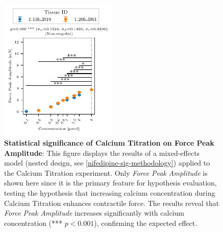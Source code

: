 \documentclass{report}
\begin{document}
    
            \begin{figure}[H]
                \centering
                \includegraphics[width=0.5\textwidth, keepaspectratio]{plots/chapter_5/ca_titration/significance_features_lmer_subset_1.pdf}
                    \caption[Statistical significance of Calcium Titration on Force Peak Amplitude]{\textbf{Statistical significance of Calcium Titration on Force Peak Amplitude}:  
                This figure displays the results of a mixed-effects model (nested design, see \ref{nifedipine-sig-methodology}) applied to the Calcium Titration experiment. Only \textit{Force Peak Amplitude} is shown here since it is the primary feature for hypothesis evaluation, testing the hypothesis that increasing calcium concentration during Calcium Titration enhances contractile force. The results reveal that \textit{Force Peak Amplitude} increases significantly with calcium concentration (*** \(p < 0.001\)), confirming the expected effect.
                }
                
                \label{fig:sig_subset_ca_titration}
            \end{figure}
\end{document}

